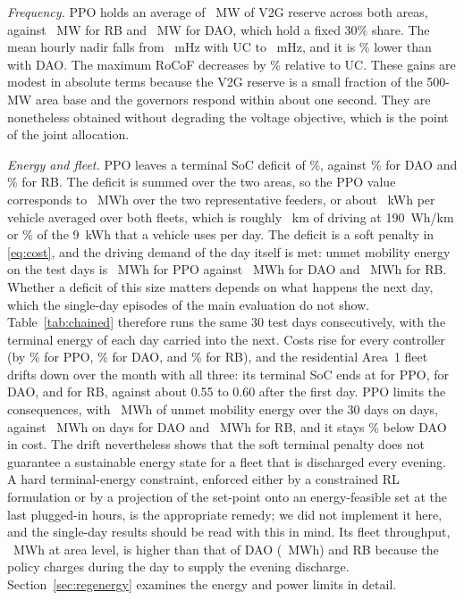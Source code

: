 \emph{Frequency.} PPO holds an average of \TPPOReserveMeanMw~MW of V2G
reserve across both areas, against \TRBReserveMeanMw~MW for RB and \TDAOReserveMeanMw~MW for DAO,
which hold a fixed 30\% share. The mean hourly nadir falls from
\TUCNadirMeanHz~mHz with UC to \TPPONadirMeanHz~mHz, and it is
\TRedNadirMeanHzDAO\% lower than with DAO. The maximum RoCoF decreases
by \TRedRocofMaxUC\% relative to UC. These gains are modest in absolute
terms because the V2G reserve is a small fraction of the 500-MW area
base and the governors respond within about one second. They are
nonetheless obtained without degrading the voltage objective, which is
the point of the joint allocation.

\emph{Energy and fleet.} PPO leaves a terminal SoC deficit of
\TPPOSocDefPct\%, against \TDAOSocDefPct\% for DAO and \TRBSocDefPct\%
for RB. The deficit is summed over the two areas, so the PPO value
corresponds to \TPPOSocDefMwh~MWh over the two representative
feeders, or about \TPPOSocDefKwhVeh~kWh per vehicle averaged over
both fleets, which is roughly \TPPOSocDefKm~km of driving at
190~Wh/km or \TPPOSocDefDrivePct\% of the 9~kWh that a vehicle uses
per day. The deficit is a soft penalty in \eqref{eq:cost}, and the
driving demand of the day itself is met: unmet mobility energy on the
test days is \TPPOUnmetMwh~MWh for PPO against \TDAOUnmetMwh~MWh for
DAO and \TRBUnmetMwh~MWh for RB. Whether a deficit of this size
matters depends on what happens the next day, which the single-day
episodes of the main evaluation do not show. Table~\ref{tab:chained}
therefore runs the same 30 test days consecutively, with the terminal
energy of each day carried into the next. Costs rise for every
controller (by \ChPPOCostRise\% for PPO, \ChDAOCostRise\% for DAO, and
\ChRBCostRise\% for RB), and the residential Area~1 fleet drifts down
over the month with all three: its terminal SoC ends at
\ChPPOSocEndFinalOne{} for PPO, \ChDAOSocEndFinalOne{} for DAO, and
\ChRBSocEndFinalOne{} for RB, against about 0.55 to 0.60 after the
first day. PPO limits the consequences, with \ChPPOUnmetMwhTotal~MWh
of unmet mobility energy over the 30 days on \ChPPOUnmetDays{} days,
against \ChDAOUnmetMwhTotal~MWh on \ChDAOUnmetDays{} days for DAO and
\ChRBUnmetMwhTotal~MWh for RB, and it stays \ChRedCostDAO\% below DAO
in cost. The drift nevertheless shows that the soft terminal penalty
does not guarantee a sustainable energy state for a fleet that is
discharged every evening. A hard terminal-energy constraint, enforced
either by a constrained RL formulation or by a projection of the
set-point onto an energy-feasible set at the last plugged-in hours,
is the appropriate remedy; we did not implement it here, and the
single-day results should be read with this in mind. Its fleet
throughput, \TPPOThroughputMwh~MWh at area level, is higher than that
of DAO (\TDAOThroughputMwh~MWh) and RB because the policy charges
during the day to supply the evening discharge.
Section~\ref{sec:regenergy} examines the energy and power limits in
detail.


